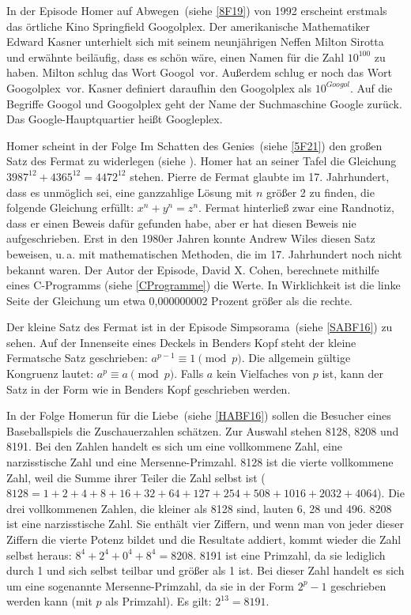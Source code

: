 \begin{appendix}
In der Episode \glqq Homer auf Abwegen\grqq\ (siehe \ref{8F19}) von 1992 erscheint erstmals das örtliche Kino \glqq Springfield Googolplex\grqq . Der amerikanische Mathematiker Edward Kasner unterhielt sich mit seinem neunjährigen Neffen Milton Sirotta und erwähnte beiläufig, dass es schön wäre, einen Namen für die Zahl $10^{100}$ zu haben. Milton schlug das Wort \glqq Googol\grqq\ vor. Außerdem schlug er noch das Wort \glqq Googolplex\grqq\ vor. Kasner definiert daraufhin den Googolplex als $10^{Googol}$. Auf die Begriffe Googol und Googolplex geht der Name der Suchmaschine Google zurück. Das Google-Hauptquartier heißt Googleplex.

Homer scheint in der Folge \glqq Im Schatten des Genies\grqq\ (siehe \ref{5F21}) den großen Satz des Fermat zu widerlegen (siehe \cite{Spektrum22}). Homer hat an seiner Tafel die Gleichung $3987^{12} + 4365^{12} = 4472^{12}$ stehen. Pierre de Fermat glaubte im 17. Jahrhundert, dass es unmöglich sei, eine ganzzahlige Lösung mit $n$ größer 2 zu finden, die folgende Gleichung erfüllt: $x^n + y^n = z^n$. Fermat hinterließ zwar eine Randnotiz, dass er einen Beweis dafür gefunden habe, aber er hat diesen Beweis nie aufgeschrieben. Erst in den 1980er Jahren konnte Andrew Wiles diesen Satz beweisen, u.\,a. mit mathematischen Methoden, die im 17. Jahrhundert noch nicht bekannt waren. Der Autor der Episode, David X. Cohen, berechnete mithilfe eines C-Programms (siehe \ref{CProgramme}) die Werte. In Wirklichkeit ist die linke Seite der Gleichung um etwa 0,000000002 Prozent größer als die rechte.

Der kleine Satz des Fermat ist in der Episode \glqq Simpsorama\grqq\ (siehe \ref{SABF16}) zu sehen. Auf der Innenseite eines Deckels in Benders Kopf steht der kleine Fermatsche Satz geschrieben: $a^{p-1} \equiv 1\pmod p$. Die allgemein gültige Kongruenz lautet: $a^p \equiv a\pmod p$. Falls $a$ kein Vielfaches von $p$ ist, kann der Satz in der Form wie in Benders Kopf geschrieben werden.

In der Folge \glqq Homerun für die Liebe\grqq\ (siehe \ref{HABF16}) sollen die Besucher eines Baseballspiels die Zuschauerzahlen schätzen. Zur Auswahl stehen 8128, 8208 und 8191. Bei den Zahlen handelt es sich um eine vollkommene Zahl, eine narzisstische Zahl und eine Mersenne-Primzahl. 8128 ist die vierte vollkommene Zahl, weil die Summe ihrer Teiler die Zahl selbst ist ($8128 = 1 + 2 + 4 + 8 + 16 + 32 + 64 + 127 + 254 + 508 + 1016 + 2032 + 4064$). Die drei vollkommenen Zahlen, die kleiner als 8128 sind, lauten 6, 28 und 496.
8208 ist eine narzisstische Zahl. Sie enthält vier Ziffern, und wenn man von jeder dieser Ziffern die vierte Potenz bildet und die Resultate addiert, kommt wieder die Zahl selbst heraus: $8^4 + 2^4 + 0^4 + 8^4 = 8208$.
8191 ist eine Primzahl, da sie lediglich durch 1 und sich selbst teilbar und größer als 1 ist. Bei dieser Zahl handelt es sich um eine sogenannte Mersenne-Primzahl, da sie in der Form $2^p -1$ geschrieben werden kann (mit $p$ als Primzahl). Es gilt: $2^{13} = 8191$.


\end{appendix}
